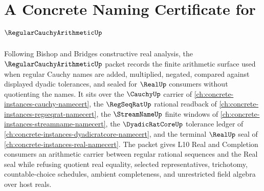 \chapter{A Concrete Naming Certificate for $\RegularCauchyArithmeticUp$}
\label{ch:concrete-instances-regular-cauchy-arithmetic-namecert}

Following Bishop and Bridges constructive real analysis, the $\RegularCauchyArithmeticUp$ packet records the finite arithmetic surface used when regular Cauchy names are added, multiplied, negated, compared against displayed dyadic tolerances, and sealed for $\RealUp$ consumers without quotienting the names. It sits over the $\CauchyUp$ carrier of \autoref{ch:concrete-instances-cauchy-namecert}, the $\RegSeqRatUp$ rational readback of \autoref{ch:concrete-instances-regseqrat-namecert}, the $\StreamNameUp$ finite windows of \autoref{ch:concrete-instances-streamname-namecert}, the $\DyadicRatCoreUp$ tolerance ledger of \autoref{ch:concrete-instances-dyadicratcore-namecert}, and the terminal $\RealUp$ seal of \autoref{ch:concrete-instances-real-namecert}. The packet gives L10 Real and Completion consumers an arithmetic carrier between regular rational sequences and the Real seal while refusing quotient real equality, selected representatives, trichotomy, countable-choice schedules, ambient completeness, and unrestricted field algebra over host reals.

